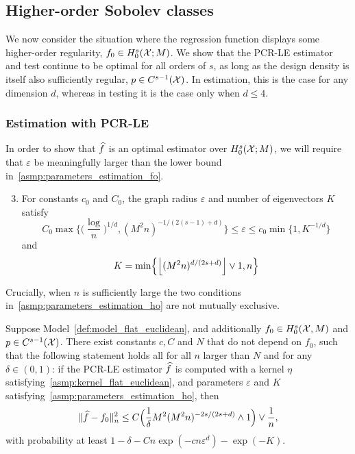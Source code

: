 \subsection{Higher-order Sobolev classes}
\label{sec:higher_order_sobolev_classes}
We now consider the situation where the regression function displays some higher-order regularity, $f_0 \in H_0^s(\mathcal{X};M)$. We show that the PCR-LE estimator and test continue to be optimal for all orders of $s$, as long as the design density is itself also sufficiently regular, $p \in C^{s - 1}(\mathcal{X})$. In estimation, this is the case for any dimension $d$, whereas in testing it is the case only when $d \leq 4$. 

\subsubsection{Estimation with PCR-LE} 
In order to show that $\widehat{f}$ is an optimal estimator over $H_0^s(\mathcal{X};M)$, we will require that $\varepsilon$ be meaningfully larger than the lower bound in~\ref{asmp:parameters_estimation_fo}.
\begin{enumerate}[label=(P\arabic*)]
	\setcounter{enumi}{2}
	\item 
	\label{asmp:parameters_estimation_ho}
	For constants $c_0$ and $C_0$, the graph radius $\varepsilon$ and number of eigenvectors $K$ satisfy
	\begin{equation}
	\label{eqn:radius_ho}
	C_0\max\biggl\{\biggl(\frac{\log}{n}\biggr)^{1/d}, (M^2n)^{-1/(2(s - 1) + d)}\biggr\} \leq \varepsilon \leq c_0\min\{1, K^{-1/d}\}
	\end{equation}
	and
	\begin{equation*}
	K = \min\Bigl\{\left\lfloor (M^2n)^{d/(2s + d)} \right\rfloor \vee 1,n\Bigr\}
	\end{equation*}
\end{enumerate}
Crucially, when $n$ is sufficiently large the two conditions in~\ref{asmp:parameters_estimation_ho} are not mutually exclusive.
\begin{theorem}
	\label{thm:laplacian_eigenmaps_estimation_ho}
	Suppose Model~\ref{def:model_flat_euclidean}, and additionally $f_0 \in H_0^s(\mathcal{X},M)$ and $p \in C^{s - 1}(\mathcal{X})$. There exist constants $c,C$ and $N$ that do not depend on $f_0$, such that the following statement holds all for all $n$ larger than $N$ and for any $\delta \in (0,1)$: if the PCR-LE estimator $\widehat{f}$ is computed with a kernel $\eta$ satisfying~\ref{asmp:kernel_flat_euclidean}, and parameters $\varepsilon$ and $K$ satisfying~\ref{asmp:parameters_estimation_ho}, then
	\begin{equation}
	\label{eqn:laplacian_eigenmaps_estimation_ho}
	\|\widehat{f} - f_0\|_n^2 \leq C\Bigl(\frac{1}{\delta}M^2(M^2n)^{-2s/(2s + d)} \wedge 1\Bigr) \vee \frac{1}{n},
	\end{equation}
	with probability at least $1 - \delta - Cn\exp(-cn\varepsilon^d) - \exp(-K)$.
\end{theorem}
